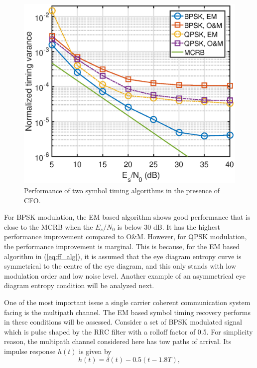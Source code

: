 \documentclass[journal,comsoc,onecolumn, 12pt,draftclsnofoot]{IEEEtran}
\begin{document}
\begin{figure}[ht]
\centering
\includegraphics[width=3 in]{pic/per_timing_frq.eps}
\caption{Performance of two symbol timing algorithms in the presence of CFO.}
\label{fig:timing_frq_per} 
\end{figure}  

For BPSK modulation, the EM based algorithm shows good performance that is close to the MCRB when the \(E_s/N_0\) is below 30 dB.
It has the highest performance improvement compared to O\&M.
However, for QPSK modulation, the performance improvement is marginal.
This is because, for the EM based algorithm in (\ref{eq:ff_alg}), it is assumed that the eye diagram entropy curve is symmetrical to the centre of the eye diagram, and this only stands with low modulation order and low noise level.
Another example of an asymmetrical eye diagram entropy condition will be analyzed next. 

One of the most important issue a single carrier coherent communication system facing is the multipath channel.
The EM based symbol timing recovery performs in these conditions will be assessed.
Consider a set of BPSK modulated signal which is pulse shaped by the RRC filter with  a rolloff factor of 0.5.
For simplicity reason, the multipath channel considered here has tow paths of arrival.
Its impulse response $h(t)$ is given by
\begin{equation}
h(t)=\delta(t)-0.5(t-1.8T),
\end{equation}
\end{document}
